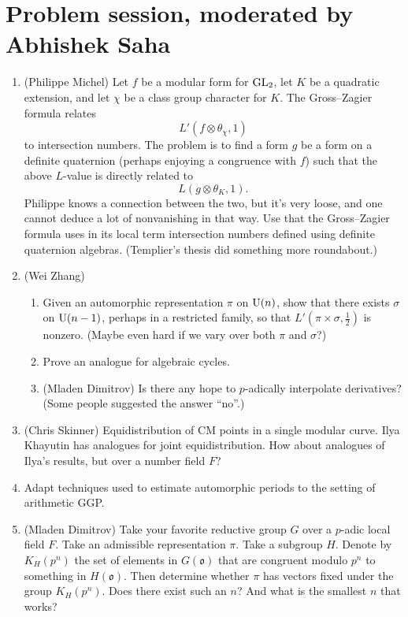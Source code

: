 \documentclass[reqno]{amsart} 
\begin{document}
\section{Problem session, moderated by Abhishek Saha}\label{sec:cnfhlpu15t}

\begin{enumerate}
\item\label{enumerate:cnej3fpbu9} (Philippe Michel) Let $f$ be a modular form for $\operatorname{GL}_2$, let $K$ be a quadratic extension, and let $\chi$ be a class group character for $K$.  The Gross--Zagier formula relates
  \begin{equation*}
    L'(f \otimes \theta_\chi, 1)
  \end{equation*}
  to intersection numbers.  The problem is to find a form $g$ be a form on a definite quaternion (perhaps enjoying a congruence with $f$) such that the above $L$-value is directly related to
  \begin{equation*}
    L(g \otimes \theta_K, 1).
  \end{equation*}
  Philippe knows a connection between the two, but it's very loose, and one cannot deduce a lot of nonvanishing in that way.  Use that the Gross--Zagier formula uses in its local term intersection numbers defined using definite quaternion algebras.  (Templier's thesis did something more roundabout.)

\item\label{enumerate:cnej3fpe3c} (Wei Zhang)
  \begin{enumerate}
  \item Given an automorphic representation $\pi$ on $\operatorname{U}(n)$, show that there exists $\sigma$ on $\operatorname{U}(n - 1)$, perhaps in a restricted family, so that $L '(\pi \times \sigma, \tfrac{1}{2})$ is nonzero.  (Maybe even hard if we vary over both $\pi$ and $\sigma$?)
  \item Prove an analogue for algebraic cycles.
  \item (Mladen Dimitrov) Is there any hope to $p$-adically interpolate derivatives?  (Some people suggested the answer ``no''.)
  \end{enumerate}
\item\label{enumerate:cnej3fpha2} (Chris Skinner) Equidistribution of CM points in a single modular curve.  Ilya Khayutin has analogues for joint equidistribution.  How about analogues of Ilya's results, but over a number field $F$?
\item\label{enumerate:cnej3fqemr} Adapt techniques used to estimate automorphic periods to the setting of arithmetic GGP.
\item\label{enumerate:cnej3fqfnd} (Mladen Dimitrov) Take your favorite reductive group $G$ over a $p$-adic local field $F$.  Take an admissible representation $\pi$.  Take a subgroup $H$.  Denote by $K_H(p^n)$ the set of elements in $G(\mathfrak{o})$ that are congruent modulo $p^n$ to something in $H(\mathfrak{o})$.  Then determine whether $\pi$ has vectors fixed under the group $K_H(p^n)$.  Does there exist such an $n$?  And what is the smallest $n$ that works?


\end{enumerate}
\end{document}
